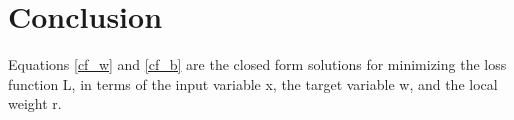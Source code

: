 \documentclass[a4paper]{article}
\begin{document}
\vspace{5mm}

\section{Conclusion}
Equations \ref{cf_w} and \ref{cf_b} are the closed form solutions for minimizing the loss function L, in terms of the input variable x, the target variable w, and the local weight r.
\end{document}
